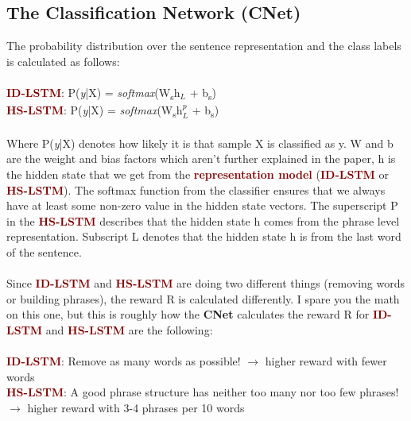 \documentclass{article}
\begin{document}
\subsection{\textcolor{yelloww}{The Classification Network (CNet)}}\label{sec:cnet}
The probability distribution over the sentence representation and the class labels is calculated as follows:\\\\
\textcolor{Maroon}{\textbf{ID-LSTM}}: P(\textit{y}|X) = \textit{softmax}(W\textsubscript{s}h$_L$ + b\textsubscript{s})\\
\textcolor{Maroon}{\textbf{HS-LSTM}}: P(\textit{y}|X) = \textit{softmax}(W\textsubscript{s}h$^p_L$ + b\textsubscript{s})\\\\
Where P(\textit{y}|X) denotes how likely it is that sample X is classified as y. W and b are the weight and bias factors which aren't further explained in the paper, h is the hidden state that we get from the \textcolor{Maroon}{\textbf{representation model}} (\textcolor{Maroon}{\textbf{ID-LSTM}} or \textcolor{Maroon}{\textbf{HS-LSTM}}). The softmax function from the classifier ensures that we always have at least some non-zero value in the hidden state vectors. The superscript P in the \textcolor{Maroon}{\textbf{HS-LSTM}} describes that the hidden state h comes from the phrase level representation. Subscript L denotes that the hidden state h is from the last word of the sentence.  \\\\
Since \textcolor{Maroon}{\textbf{ID-LSTM}} and \textcolor{Maroon}{\textbf{HS-LSTM}} are doing two different things (removing words or building phrases), the reward R is calculated differently. I spare you the math on this one, but this is roughly how the \textcolor{yelloww}{\textbf{CNet}} calculates the reward R for \textcolor{Maroon}{\textbf{ID-LSTM}} and \textcolor{Maroon}{\textbf{HS-LSTM}} are the following:\\\\
\textcolor{Maroon}{\textbf{ID-LSTM}}: Remove as many words as possible! $\rightarrow$ higher reward with fewer words\\
\textcolor{Maroon}{\textbf{HS-LSTM}}: A good phrase structure has neither too many nor too few phrases! $\rightarrow$ higher reward with 3-4 phrases per 10 words
\end{document}
